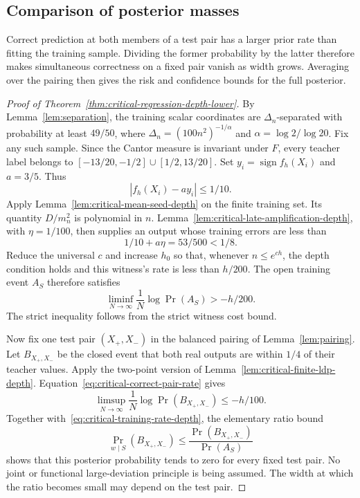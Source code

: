 \subsection{Comparison of posterior masses}

Correct prediction at both members of a test pair has a larger prior
rate than fitting the training sample. Dividing the former probability
by the latter therefore makes simultaneous correctness on a fixed pair
vanish as width grows. Averaging over the pairing then gives the risk
and confidence bounds for the full posterior.

\begin{proof}[Proof of Theorem~\ref{thm:critical-regression-depth-lower}]
By Lemma~\ref{lem:separation}, the training scalar coordinates are
$\Delta_n$-separated with probability at least $49/50$, where
$\Delta_n=(100n^2)^{-1/\alpha}$ and $\alpha=\log2/\log20$.
Fix any such sample. Since the Cantor measure is invariant under $F$,
every teacher label belongs to
$[-13/20,-1/2]\cup[1/2,13/20]$.
Set $y_i=\operatorname{sign}f_h(X_i)$ and $a=3/5$. Thus
\[
 |f_h(X_i)-ay_i|\le1/10.
\]
Apply Lemma~\ref{lem:critical-mean-seed-depth} on the finite training
set. Its quantity $D/m_n^2$ is polynomial in $n$.
Lemma~\ref{lem:critical-late-amplification-depth}, with $\eta=1/100$,
then supplies an output whose training errors are less than
\[
 1/10+a\eta=53/500<1/8.
\]
Reduce the universal $c$ and increase $h_0$ so that, whenever
$n\le e^{ch}$, the depth condition holds and this witness's rate is
less than $h/200$. The open training event $A_S$ therefore satisfies
\begin{equation}\label{eq:critical-training-rate-depth}
 \liminf_{N\to\infty}\frac1N\log\Pr(A_S)>-h/200.
\end{equation}
The strict inequality follows from the strict witness cost bound.

Now fix one test pair $(X_+,X_-)$ in the balanced pairing of
Lemma~\ref{lem:pairing}. Let $B_{X_+,X_-}$ be the closed event that
both real outputs are within $1/4$ of their teacher values.
Apply the two-point version of Lemma~\ref{lem:critical-finite-ldp-depth}.
Equation~\eqref{eq:critical-correct-pair-rate} gives
\[
 \limsup_{N\to\infty}\frac1N\log\Pr(B_{X_+,X_-})\le-h/100.
\]
Together with~\eqref{eq:critical-training-rate-depth}, the elementary
ratio bound
\[
 \Pr_{w\mid S}(B_{X_+,X_-})
 \le\frac{\Pr(B_{X_+,X_-})}{\Pr(A_S)}
\]
shows that this posterior probability tends to zero for every fixed
test pair. No joint or functional large-deviation principle is being
assumed. The width at which the ratio becomes small may depend on
the test pair.


\end{proof}
